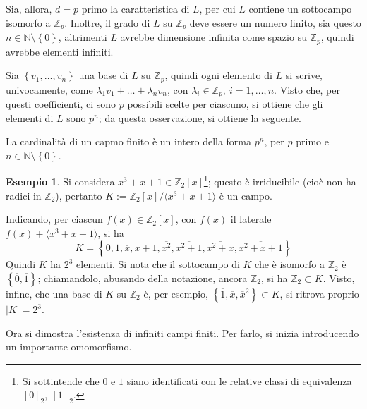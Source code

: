\documentclass[11pt, a4paper]{scrartcl}
\theoremstyle{definition}
\newtheorem{esempio}{Esempio}
\numberwithin{esempio}{section}
\theoremstyle{definition}
\numberwithin{obs}{section}
\numberwithin{nota}{section}
\numberwithin{equation}{subsection}
\begin{document}
Sia, allora, $d = p$ primo la caratteristica di $L$, per cui $L$ contiene un sottocampo isomorfo a $\mathbb{Z}_p$.
Inoltre, il grado di $L$ su $\mathbb{Z}_p$ deve essere un numero finito, sia questo $n \in \mathbb{N}\setminus\left\{ 0 \right\} $, altrimenti $L$ avrebbe dimensione infinita come spazio su $\mathbb{Z}_p$, quindi avrebbe elementi infiniti.

Sia $\left\{ v_1,\ldots,v_n \right\} $ una base di $L$ su $\mathbb{Z}_p$, quindi ogni elemento di $L$ si scrive, univocamente, come $\lambda _1 v_1 + \ldots + \lambda _n v_n$, con $\lambda _i \in \mathbb{Z}_p, \ i = 1,\ldots,n$.
Visto che, per questi coefficienti, ci sono $p$ possibili scelte per ciascuno, si ottiene che gli elementi di $L$ sono $p^n$; da questa osservazione, si ottiene la seguente.
\begin{prop}
	{}{}
	La cardinalit\`a di un capmo finito \`e un intero della forma $p^n$, per $p$ primo e $n \in \mathbb{N}\setminus\left\{ 0 \right\} $.
\end{prop}
\begin{esempio}
	Si considera $x^3 + x + 1 \in \mathbb{Z}_2 [x]$\footnote{Si sottintende che $0 $ e $1$ siano identificati con le relative classi di equivalenza $[0]_2, \ [1]_2$.}; questo \`e irriducibile (cio\`e non ha radici in $\mathbb{Z}_2$), pertanto $K := \mathbb{Z}_2 [x] / \langle x^3 + x + 1 \rangle$ \`e un campo.

	Indicando, per ciascun $f(x) \in \mathbb{Z}_2 [x]$, con $\overline{f(x)}$ il laterale $f(x) + \langle x^3 + x + 1 \rangle$, si ha
	\[
	K = \left\{ \overline{0}, \overline{1}, \overline{x}, \overline{x+1}, \overline{x^2}, \overline{x^2 + 1}, \overline{x^2 + x}, \overline{x^2 + x + 1} \right\} 
	\] 
	Quindi $K$ ha $2^3$ elementi.
	Si nota che il sottocampo di $K$ che \`e isomorfo a $\mathbb{Z}_2$ \`e $\left\{ \overline{0}, \overline{1} \right\} $; chiamandolo, abusando della notazione, ancora $\mathbb{Z}_2$, si ha $\mathbb{Z}_2 \subset K$.
	Visto, infine, che una base di $K$ su $\mathbb{Z}_2$ \`e, per esempio, $\left\{ \overline{1}, \overline{x}, \overline{x}^2 \right\} \subset K$, si ritrova proprio $|K|=2^3$.
\end{esempio}
\noindent Ora si dimostra l'esistenza di infiniti campi finiti.
Per farlo, si inizia introducendo un importante omomorfismo.
\end{document}
